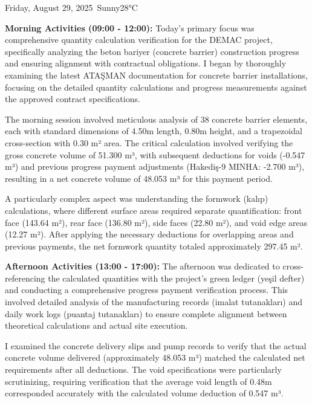 \begin{dailyentry}{Friday, August 29, 2025}{\weathersunny\ Sunny}{28°C}

\begin{workcontent}
\textbf{Morning Activities (09:00 - 12:00):} Today's primary focus was comprehensive quantity calculation verification for the DEMAC project, specifically analyzing the beton bariyer (concrete barrier) construction progress and ensuring alignment with contractual obligations. I began by thoroughly examining the latest ATAŞMAN documentation for concrete barrier installations, focusing on the detailed quantity calculations and progress measurements against the approved contract specifications.

The morning session involved meticulous analysis of 38 concrete barrier elements, each with standard dimensions of 4.50m length, 0.80m height, and a trapezoidal cross-section with 0.30 m² area. The critical calculation involved verifying the gross concrete volume of 51.300 m³, with subsequent deductions for voids (-0.547 m³) and previous progress payment adjustments (Hakediş-9 MINHA: -2.700 m³), resulting in a net concrete volume of 48.053 m³ for this payment period.

A particularly complex aspect was understanding the formwork (kalıp) calculations, where different surface areas required separate quantification: front face (143.64 m²), rear face (136.80 m²), side faces (22.80 m²), and void edge areas (12.27 m²). After applying the necessary deductions for overlapping areas and previous payments, the net formwork quantity totaled approximately 297.45 m².

\textbf{Afternoon Activities (13:00 - 17:00):} The afternoon was dedicated to cross-referencing the calculated quantities with the project's green ledger (yeşil defter) and conducting a comprehensive progress payment verification process. This involved detailed analysis of the manufacturing records (imalat tutanakları) and daily work logs (puantaj tutanakları) to ensure complete alignment between theoretical calculations and actual site execution.

I examined the concrete delivery slips and pump records to verify that the actual concrete volume delivered (approximately 48.053 m³) matched the calculated net requirements after all deductions. The void specifications were particularly scrutinizing, requiring verification that the average void length of 0.48m corresponded accurately with the calculated volume deduction of 0.547 m³.


\end{workcontent}
\end{dailyentry}
